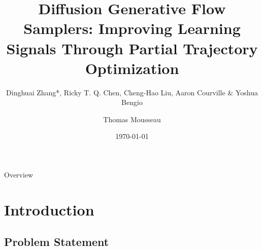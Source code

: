 \documentclass[aspectratio=169,xcolor=dvipsnames]{beamer}
\title{Diffusion Generative Flow Samplers: Improving Learning Signals Through Partial Trajectory Optimization}
\subtitle{Dinghuai Zhang*, Ricky T. Q. Chen, Cheng-Hao Liu, Aaron Courville \& Yoshua Bengio}
\author{Thomas Mousseau}
\date{\today} %
\begin{document}
\begin{frame}
    \vspace*{-2cm}
    \titlepage
\end{frame}

\begin{frame}{Overview}
    \tableofcontents
\end{frame}


\section{Introduction}

\subsection{Problem Statement}
\end{document}
